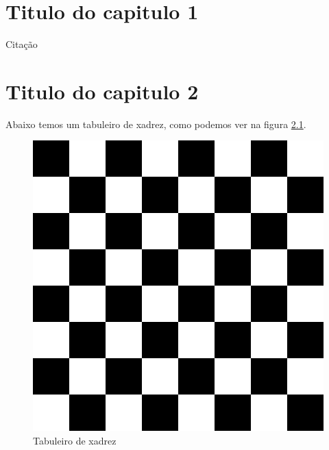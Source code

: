 \documentclass{tcc_dcomp}
\begin{document}
  \chapter{Titulo do capitulo 1}
  Citação \cite{autor:00}

  \chapter{Titulo do capitulo 2}
  Abaixo temos um tabuleiro de xadrez, como podemos ver na figura
  \ref{fig:xadrez}.

  \begin{figure}[ht]
  \centering
  \includegraphics[width=.5\textwidth]{figuras/xadrez.png}
  \caption{Tabuleiro de xadrez}
  \label{fig:xadrez}
  \end{figure}

  
  
\end{document}
